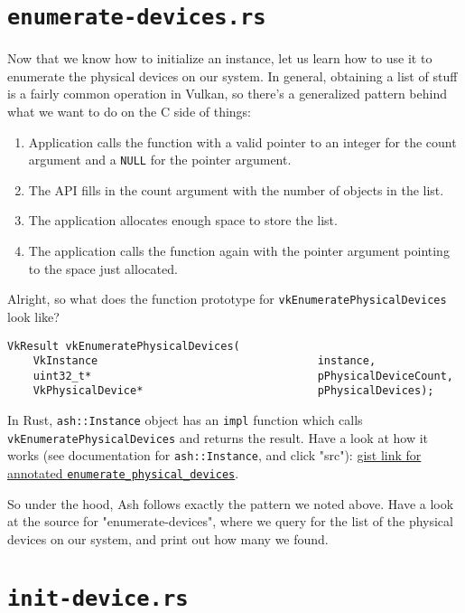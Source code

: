 \documentclass[12pt,letterpaper]{article}
\newcommand{\ril}[1]{\texttt{#1}}
\newcommand{\cil}[1]{\texttt{#1}}
\begin{document}
\section{\texttt{enumerate-devices.rs}}
	Now that we know how to initialize an instance, let us learn how to use it to enumerate the physical devices on our system. In general, obtaining a list of stuff is a fairly common operation in Vulkan, so there's a generalized pattern behind what we want to do on the C side of things:
		\begin{enumerate}
			\item Application calls the function with a valid pointer to an integer for the count argument and a \cil{NULL} for the pointer argument.
			
			\item The API fills in the count argument with the number of objects in the list.
			
			\item The application allocates enough space to store the list.
			
			\item The application calls the function again with the pointer argument pointing to the space just allocated.
		\end{enumerate}
	
	Alright, so what does the function prototype for \cil{vkEnumeratePhysicalDevices} look like?
	\begin{verbatim}
VkResult vkEnumeratePhysicalDevices(
	VkInstance                                  instance,
	uint32_t*                                   pPhysicalDeviceCount,
	VkPhysicalDevice*                           pPhysicalDevices);
	\end{verbatim}
	
	In Rust, \ril{ash::Instance} object has an \ril{impl} function which calls \cil{vkEnumeratePhysicalDevices} and returns the result. Have a look at how it works (see documentation for \ril{ash::Instance}, and click "src"): \href{https://gist.github.com/bzm3r/175cd2b63db8f783ed968df20462be67}{gist link for annotated \texttt{enumerate\_physical\_devices}}.
		
	So under the hood, Ash follows exactly the pattern we noted above. Have a look at the source for "enumerate-devices", where we query for the list of the physical devices on our system, and print out how many we found.
	
\section{\texttt{init-device.rs}}
\end{document}
